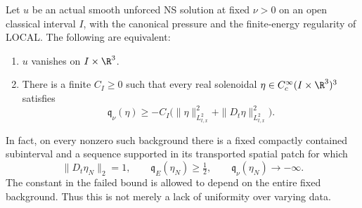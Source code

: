 \begin{theorem}
\label{va:classification}
Let $u$ be an actual smooth unforced NS solution at fixed $\nu>0$ on an open
classical interval $I$, with the canonical pressure and the finite-energy
regularity of \textup{LOCAL}. The following are equivalent:
\begin{enumerate}
\item $u$ vanishes on $I\times\R^3$.
\item There is a finite $C_I\ge0$ such that every real solenoidal
$\eta\in C_c^\infty(I\times\R^3)^3$ satisfies
\[
 \mathfrak q_\nu(\eta)\ge
 -C_I\bigl(\|\eta\|_{L^2_{t,x}}^2+\|D_t\eta\|_{L^2_{t,x}}^2\bigr).
\]
\end{enumerate}
In fact, on every nonzero such background there is a fixed compactly
contained subinterval and a sequence supported in its transported spatial
patch for which
\[
 \|D_t\eta_N\|_2=1,\qquad
 \mathfrak q_E(\eta_N)\ge\tfrac12,\qquad
 \mathfrak q_\nu(\eta_N)\longrightarrow-\infty.
\]
The constant in the failed bound is allowed to depend on the entire fixed
background. Thus this is not merely a lack of uniformity over varying data.
\end{theorem}

